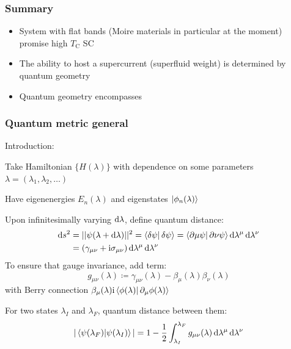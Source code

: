 \documentclass[aspectratio=169]{beamer}
\begin{document}

\begin{frame}
	\frametitle{Summary}
	
	\begin{itemize}
		\item System with flat bands (Moire materials in particular at the moment) promise high \(T_{\textrm{C}}\) SC
		\item The ability to host a supercurrent (superfluid weight) is determined by quantum geometry
		\item Quantum geometry encompasses 
	\end{itemize}	
\end{frame}

\begin{frame}
	\frametitle{Quantum metric general}
	
	Introduction:
	
	Take Hamiltonian \(\{H(\lambda)\}\) with dependence on some parameters \(\lambda = (\lambda_1, \lambda_2, \ldots)\)
	
	Have eigenenergies \(E_n (\lambda)\) and eigenstates \(\ket{\phi_n (\lambda)}\)
	
	Upon infinitesimally varying \(\odif{\lambda}\), define quantum distance:
	\begin{align}
		\odif{s}^2 &= \vert \vert \psi (\lambda + \odif{\lambda}) \vert \vert^2 = \braket{\fdif{\psi} | \fdif{\psi}} = \braket{\pdif*{\mu} \psi | \pdif*{\nu} \psi} \odif{\lambda^{\mu}} \odif{\lambda^{\nu}} \\
		&= (\gamma_{\mu \nu} + \iu \sigma_{\mu \nu}) \odif{\lambda^{\mu}} \odif{\lambda^{\nu}}
	\end{align}
	To ensure that gauge invariance, add term:
	\begin{equation}
		g_{\mu \nu} (\lambda) \coloneqq \gamma_{\mu \nu} (\lambda) - \beta_{\mu} (\lambda) \beta_{\nu} (\lambda)
	\end{equation}
	with Berry connection \(\beta_{\mu} (\lambda) \iu \braket{\phi(\lambda) | \pdif{\mu} \phi(\lambda)}\)
	
	For two states \(\lambda_I\) and \(\lambda_F\), quantum distance between them:
	\begin{align}
		\vert \braket{\psi (\lambda_F) | \psi(\lambda_I)} \vert = 1 - \frac{1}{2} \int_{\lambda_I}^{\lambda_F} g_{\mu \nu} (\lambda) \odif{\lambda^{\mu}} \odif{\lambda^{\nu}}
	\end{align}
\end{frame}
\end{document}

